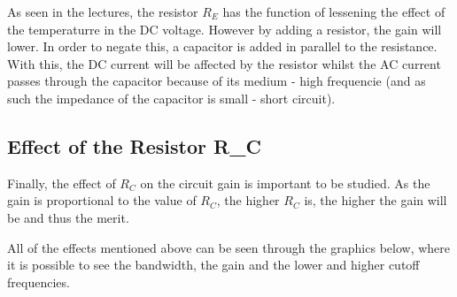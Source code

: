 \par As seen in the lectures, the resistor $R_E$ has the function of lessening the effect of the temperaturre in the DC voltage. However by adding a resistor, the gain will lower. In order to negate this, a capacitor is added in parallel to the resistance. With this, the DC current will be affected by the resistor whilst the AC current passes through the capacitor because of its medium - high frequencie (and as such the impedance of the capacitor is small - short circuit).

\subsection{Effect of the Resistor R_C}

\par Finally, the effect of $R_C$ on the circuit gain is important to be studied. As the gain is proportional to the value of $R_C$, the higher $R_C$ is, the higher the gain will be and thus the merit. 

\par All of the effects mentioned above can be seen through the graphics below, where it is possible to see the bandwidth, the gain and the lower and higher cutoff frequencies.

